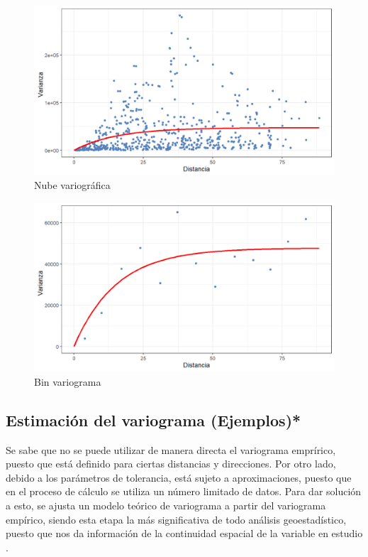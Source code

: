 \documentclass[
]{book}
\begin{document}
\begin{figure}
\includegraphics[width=17.78in]{figuras/otros/cloud_variogram} \caption{Nube variográfica}\label{fig:varcloud1}
\end{figure}
\begin{figure}
\includegraphics[width=17.78in]{figuras/otros/bin_variogram} \caption{Bin variograma}\label{fig:varcloud2}
\end{figure}

\hypertarget{estimaciuxf3n-del-variograma-ejemplos}{%
\subsection{Estimación del variograma (Ejemplos)*}\label{estimaciuxf3n-del-variograma-ejemplos}}

Se sabe que no se puede utilizar de manera directa el variograma emprírico, puesto que está definido para ciertas distancias y direcciones. Por otro lado, debido a los parámetros de tolerancia, está sujeto a aproximaciones, puesto que en el proceso de cálculo se utiliza un número limitado de datos. Para dar solución a esto, se ajusta un modelo teórico de variograma a partir del variograma empírico, siendo esta etapa la más significativa de todo análisis geoestadístico, puesto que nos da información de la continuidad espacial de la variable en estudio \citep{emery}.
\end{document}

